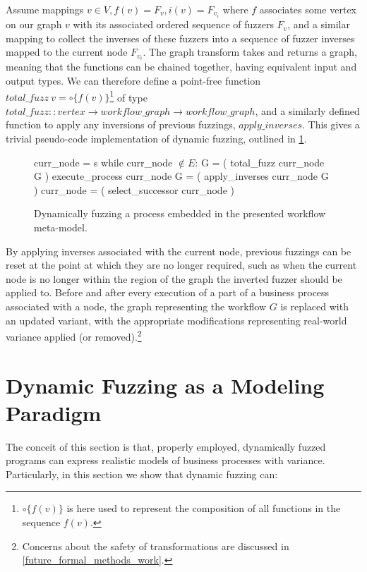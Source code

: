 \documentclass[12pt]{llncs}  %
\begin{document}
Assume mappings \(v \in V, f(v)=F_v, i(v)=F_{v_i}\) where $f$ associates some
vertex on our graph $v$ with its associated ordered sequence of fuzzers $F_v$,
and a similar mapping to collect the inverses of these fuzzers into a sequence
of fuzzer inverses mapped to the current node $F_{v_i}$. The graph transform
takes and returns a graph, meaning that the functions can be chained together,
having equivalent input and output types. We can therefore define a point-free
function $total\_fuzz~v = \circ\{f(v)\}$\footnote{$\circ\{f(v)\}$ is here used
  to represent the composition of all functions in the sequence $f(v)$.} of type
$total\_fuzz :: vertex \rightarrow workflow\_graph \rightarrow workflow\_graph$,
and a similarly defined function to apply any inversions of previous fuzzings,
$apply\_inverses$. This gives a trivial pseudo-code implementation of dynamic
fuzzing, outlined in \cref{fig:workflow_metamodel_df}.

\begin{figure}[h]
  \begin{algorithm}
    curr_node = s
    while curr_node $\notin{} E$:
        G = ( total_fuzz curr_node G )
        execute_process
        curr_node G = ( apply_inverses curr_node G )
        curr_node = ( select_successor curr_node )
  \end{algorithm}
  \caption[Dynamically Fuzzed workflow meta-model]{Dynamically fuzzing a process
    embedded in the presented workflow meta-model.}
  \label{fig:workflow_metamodel_df}
\end{figure}



By applying inverses associated with the current node, previous fuzzings can be
reset at the point at which they are no longer required, such as when the
current node is no longer within the region of the graph the inverted fuzzer
should be applied to. Before and after every execution of a part of a business
process associated with a node, the graph representing the workflow $G$ is
replaced with an updated variant, with the appropriate modifications
representing real-world variance applied (or removed).\footnote{Concerns about
  the safety of transformations are discussed in
  \cref{future_formal_methods_work}.}
\par

\section{Dynamic Fuzzing as a Modeling Paradigm}
\label{sec:dynamic_fuzzing_benefits}
The conceit of this section is that, properly employed, dynamically fuzzed
programs can express realistic models of business processes with variance.
Particularly, in this section we show that dynamic fuzzing can:
\end{document}
